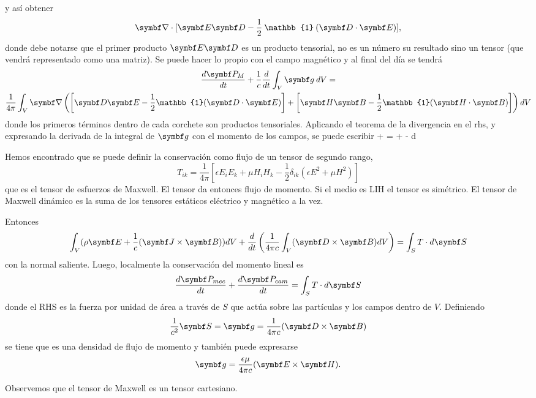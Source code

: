 \documentclass[10pt,oneside]{CBFT_book}
\begin{document}
y así obtener
\[
	\Nabla \cdot[ \vb{E}\vb{D} - \frac{1}{2} \: \mathbb{1} \: (\pe{D}{E}) ],
\]
donde debe notarse que el primer producto $\vb{E}\vb{D}$ es un producto tensorial, no es un
número su resultado sino un tensor (que vendrá representado como una matriz).
Se puede hacer lo propio con el campo magnético y al final del día se tendrá
\begin{multline*}
	\dtot{\vb{P}_M}{t} + \frac{1}{c} \dtot{}{t}\int_V \vb{g} \: dV = \\
	\frac{1}{4\pi} \int_V \Nabla\left( \left[ \vb{D}\vb{E} - 
	\frac{1}{2}\mathbb{1}( \pe{D}{E}) \right] + 
	\left[ \vb{H}\vb{B} - \frac{1}{2}\mathbb{1}(\pe{H}{B}) \right] \right) dV
\end{multline*}
donde los primeros términos dentro de cada corchete son productos tensoriales.
Aplicando el teorema de la divergencia en el rhs, y expresando la derivada de la integral
de $\vb{g}$ con el momento de los campos, se puede escribir
\be
	 +   =
	 \int \:  + 
	-  \:  \left[ \: \pe{D}{E} + \pe{H}{B} \: \right] \: d
\ee


Hemos encontrado que se puede definir la conservación como flujo de un tensor de segundo rango,
\[
	T_{ik} = \frac{1}{4\pi}\left[ \epsilon E_iE_k + \mu H_iH_k - \frac{1}{2}\delta_{ik}
	( \epsilon E^2 + \mu H^2)\right]
\]
que es el tensor de esfuerzos de Maxwell. El tensor da entonces flujo de momento. Si el
medio es LIH el tensor es simétrico.
El tensor de Maxwell dinámico es la suma de los tensores estáticos eléctrico y magnético
a la vez.

Entonces
\[
	\int_V (\rho\vb{E} + \frac{1}{c}(\pv{J}{B}) ) dV + 
	\dtot{}{t}\left( \frac{1}{4\pi c}\int_V (\pv{D}{B})dV\right) = \int_S T \cdot d\vb{S}
\]
con la normal saliente. Luego, localmente la conservación del momento lineal es
\[
	\dtot{\vb{P}_{mec}}{t} + \dtot{\vb{P}_{cam}}{t}  = \int_S T \cdot d\vb{S}
\]
donde el RHS es la fuerza por unidad de área a través de $S$ que actúa sobre las partículas y
los campos dentro de $V$.
Definiendo
\[
	\frac{1}{c^2} \vb{S}=  \vb{g} = \frac{1}{4\pi c}(\pv{D}{B})
\]
se tiene que  es una densidad de flujo de momento y también puede expresarse
\[
	\vb{g} = \frac{\epsilon\mu}{4\pi c}(\pv{E}{H}).
\]

Observemos que el tensor de Maxwell es un tensor cartesiano.
\end{document}
